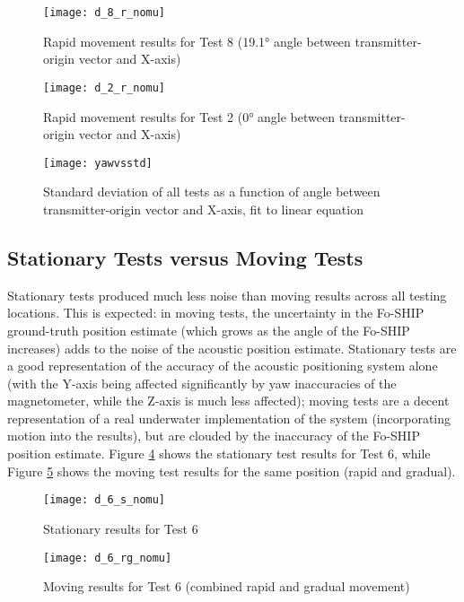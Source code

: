\documentclass[11pt]{ucthesisCP}
\begin{document}
\begin{figure}[htbp]
	\centering
	\texttt{[image: d\_8\_r\_nomu]}
	\caption{Rapid movement results for Test 8 (19.1° angle between transmitter-origin vector and X-axis)}
	\label{fig:d_8_r_nomu}
\end{figure}

\begin{figure}[htbp]
	\centering
	\texttt{[image: d\_2\_r\_nomu]}
	\caption{Rapid movement results for Test 2 (0° angle between transmitter-origin vector and X-axis)}
	\label{fig:d_2_r_nomu}
\end{figure}

\begin{figure}[htbp]
	\centering
	\texttt{[image: yawvsstd]}
	\caption{Standard deviation of all tests as a function of angle between transmitter-origin vector and X-axis, fit to linear equation}
	\label{fig:yawvsstd}
\end{figure}

\subsection{Stationary Tests versus Moving Tests} \label{ssec:6s2s3}
Stationary tests produced much less noise than moving results across all testing locations. This is expected: in moving tests, the uncertainty in the Fo-SHIP ground-truth position estimate (which grows as the angle of the Fo-SHIP increases) adds to the noise of the acoustic position estimate. Stationary tests are a good representation of the accuracy of the acoustic positioning system alone (with the Y-axis being affected significantly by yaw inaccuracies of the magnetometer, while the Z-axis is much less affected); moving tests are a decent representation of a real underwater implementation of the system (incorporating motion into the results), but are clouded by the inaccuracy of the Fo-SHIP position estimate. Figure \ref{fig:d_6_s_nomu} shows the stationary test results for Test 6, while Figure \ref{fig:d_6_rg_nomu} shows the moving test results for the same position (rapid and gradual).

\begin{figure}[htbp]
	\centering
	\texttt{[image: d\_6\_s\_nomu]}
	\caption{Stationary results for Test 6}
	\label{fig:d_6_s_nomu}
\end{figure}

\begin{figure}[htbp]
	\centering
	\texttt{[image: d\_6\_rg\_nomu]}
	\caption{Moving results for Test 6 (combined rapid and gradual movement)}
	\label{fig:d_6_rg_nomu}
\end{figure}
\end{document}
